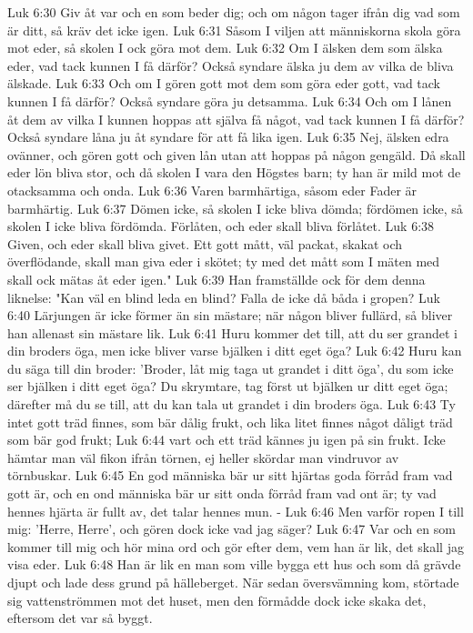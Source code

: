 Luk 6:30  Giv åt var och en som beder dig; och om någon tager ifrån dig vad som är ditt, så kräv det icke igen.
Luk 6:31  Såsom I viljen att människorna skola göra mot eder, så skolen I ock göra mot dem.
Luk 6:32  Om I älsken dem som älska eder, vad tack kunnen I få därför? Också syndare älska ju dem av vilka de bliva älskade.
Luk 6:33  Och om I gören gott mot dem som göra eder gott, vad tack kunnen I få därför? Också syndare göra ju detsamma.
Luk 6:34  Och om I lånen åt dem av vilka I kunnen hoppas att själva få något, vad tack kunnen I få därför? Också syndare låna ju åt syndare för att få lika igen.
Luk 6:35  Nej, älsken edra ovänner, och gören gott och given lån utan att hoppas på någon gengäld. Då skall eder lön bliva stor, och då skolen I vara den Högstes barn; ty han är mild mot de otacksamma och onda.
Luk 6:36  Varen barmhärtiga, såsom eder Fader är barmhärtig.
Luk 6:37  Dömen icke, så skolen I icke bliva dömda; fördömen icke, så skolen I icke bliva fördömda. Förlåten, och eder skall bliva förlåtet.
Luk 6:38  Given, och eder skall bliva givet. Ett gott mått, väl packat, skakat och överflödande, skall man giva eder i skötet; ty med det mått som I mäten med skall ock mätas åt eder igen."
Luk 6:39  Han framställde ock för dem denna liknelse: "Kan väl en blind leda en blind? Falla de icke då båda i gropen?
Luk 6:40  Lärjungen är icke förmer än sin mästare; när någon bliver fullärd, så bliver han allenast sin mästare lik.
Luk 6:41  Huru kommer det till, att du ser grandet i din broders öga, men icke bliver varse bjälken i ditt eget öga?
Luk 6:42  Huru kan du säga till din broder: 'Broder, låt mig taga ut grandet i ditt öga', du som icke ser bjälken i ditt eget öga? Du skrymtare, tag först ut bjälken ur ditt eget öga; därefter må du se till, att du kan tala ut grandet i din broders öga.
Luk 6:43  Ty intet gott träd finnes, som bär dålig frukt, och lika litet finnes något dåligt träd som bär god frukt;
Luk 6:44  vart och ett träd kännes ju igen på sin frukt. Icke hämtar man väl fikon ifrån törnen, ej heller skördar man vindruvor av törnbuskar.
Luk 6:45  En god människa bär ur sitt hjärtas goda förråd fram vad gott är, och en ond människa bär ur sitt onda förråd fram vad ont är; ty vad hennes hjärta är fullt av, det talar hennes mun. -
Luk 6:46  Men varför ropen I till mig: 'Herre, Herre', och gören dock icke vad jag säger?
Luk 6:47  Var och en som kommer till mig och hör mina ord och gör efter dem, vem han är lik, det skall jag visa eder.
Luk 6:48  Han är lik en man som ville bygga ett hus och som då grävde djupt och lade dess grund på hälleberget. När sedan översvämning kom, störtade sig vattenströmmen mot det huset, men den förmådde dock icke skaka det, eftersom det var så byggt.
